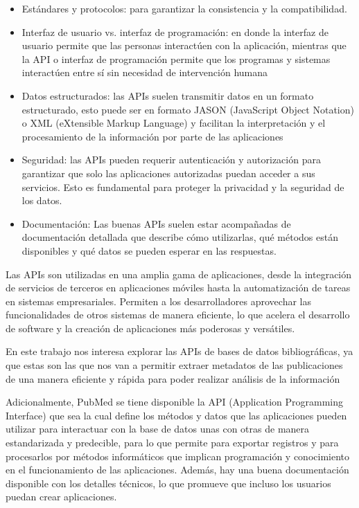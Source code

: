  \smallskip
\begin{itemize}
\item Estándares y protocolos: para garantizar la consistencia y la compatibilidad.
\item Interfaz de usuario vs. interfaz de programación: en donde la interfaz de usuario permite que las personas interactúen con la aplicación, mientras que la API o interfaz de programación permite que los programas y sistemas interactúen entre sí sin necesidad de intervención humana
\item Datos estructurados: las APIs suelen transmitir datos en un formato estructurado, esto puede ser en formato JASON (JavaScript Object Notation) o XML (eXtensible Markup Language) y facilitan la interpretación y el procesamiento de la información por parte de las aplicaciones
\item Seguridad: las APIs pueden requerir autenticación y autorización para garantizar que solo las aplicaciones autorizadas puedan acceder a sus servicios. Esto es fundamental para proteger la privacidad y la seguridad de los datos.
\item Documentación: Las buenas APIs suelen estar acompañadas de documentación detallada que describe cómo utilizarlas, qué métodos están disponibles y qué datos se pueden esperar en las respuestas.
\end{itemize}

Las APIs son utilizadas en una amplia gama de aplicaciones, desde la integración de servicios de terceros en aplicaciones móviles hasta la automatización de tareas en sistemas empresariales. Permiten a los desarrolladores aprovechar las funcionalidades de otros sistemas de manera eficiente, lo que acelera el desarrollo de software y la creación de aplicaciones más poderosas y versátiles. 

 \smallskip
En este trabajo nos interesa explorar las APIs de bases de datos bibliográficas, ya que estas son las que nos van a permitir extraer metadatos de las publicaciones de una manera eficiente y rápida para poder realizar análisis de la información  

\smallskip
Adicionalmente, PubMed se tiene disponible la API (Application Programming Interface) que sea la cual define los métodos y datos que las aplicaciones pueden utilizar para interactuar con la base de datos unas con otras de manera estandarizada y predecible, para lo que permite para exportar registros y para procesarlos por métodos informáticos que implican programación y conocimiento en el funcionamiento de las aplicaciones. Además, hay una buena documentación disponible con los detalles técnicos, lo que promueve que incluso los usuarios puedan crear aplicaciones. 

